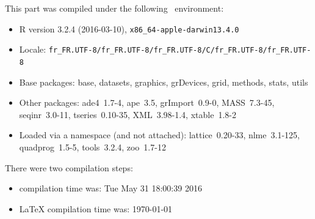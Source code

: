 \documentclass{article}
\begin{document}
\begin{scriptsize}

This part was compiled under the following \Rlogo{}~environment:

\begin{itemize}\raggedright
  \item R version 3.2.4 (2016-03-10), \verb|x86_64-apple-darwin13.4.0|
  \item Locale: \verb|fr_FR.UTF-8/fr_FR.UTF-8/fr_FR.UTF-8/C/fr_FR.UTF-8/fr_FR.UTF-8|
  \item Base packages: base, datasets, graphics, grDevices, grid,
    methods, stats, utils
  \item Other packages: ade4~1.7-4, ape~3.5, grImport~0.9-0,
    MASS~7.3-45, seqinr~3.0-11, tseries~0.10-35, XML~3.98-1.4,
    xtable~1.8-2
  \item Loaded via a namespace (and not attached): lattice~0.20-33,
    nlme~3.1-125, quadprog~1.5-5, tools~3.2.4, zoo~1.7-12
\end{itemize}
There were two compilation steps:

\begin{itemize}
  \item \Rlogo{} compilation time was: Tue May 31 18:00:39 2016
  \item \LaTeX{} compilation time was: \today
\end{itemize}

\end{scriptsize}


\clearpage
{}


\end{document}
